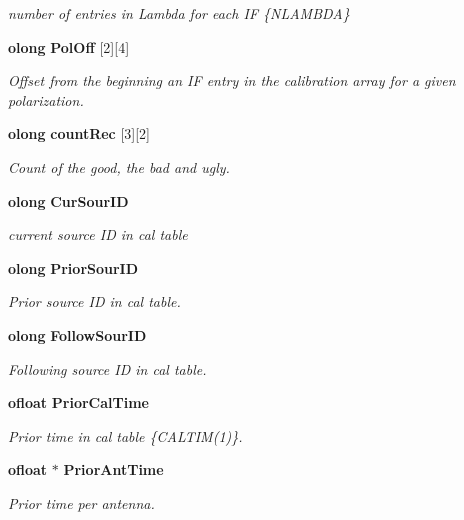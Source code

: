 \begin{CompactItemize}
\begin{CompactList}\small\item\em number of entries in Lambda for each IF \{NLAMBDA\} \item\end{CompactList}\item 
{\bf olong} {\bf Pol\-Off} [2][4]
\begin{CompactList}\small\item\em Offset from the beginning an IF entry in the calibration array for a given polarization. \item\end{CompactList}\item 
{\bf olong} {\bf count\-Rec} [3][2]
\begin{CompactList}\small\item\em Count of the good, the bad and ugly. \item\end{CompactList}\item 
{\bf olong} {\bf Cur\-Sour\-ID}
\begin{CompactList}\small\item\em current source ID in cal table \item\end{CompactList}\item 
{\bf olong} {\bf Prior\-Sour\-ID}
\begin{CompactList}\small\item\em Prior source ID in cal table. \item\end{CompactList}\item 
{\bf olong} {\bf Follow\-Sour\-ID}
\begin{CompactList}\small\item\em Following source ID in cal table. \item\end{CompactList}\item 
{\bf ofloat} {\bf Prior\-Cal\-Time}
\begin{CompactList}\small\item\em Prior time in cal table \{CALTIM(1)\}. \item\end{CompactList}\item 
{\bf ofloat} $\ast$ {\bf Prior\-Ant\-Time}
\begin{CompactList}\small\item\em Prior time per antenna. \item\end{CompactList}\item 

\end{CompactItemize}
